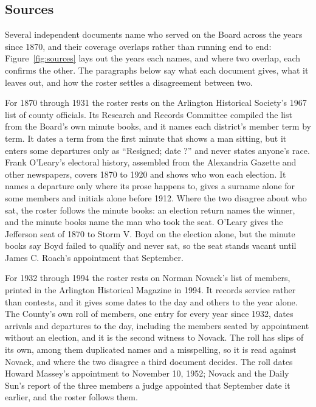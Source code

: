 \subsection{Sources}
Several independent documents name who served on the Board across the years
since 1870, and their coverage overlaps rather than running end to end:
Figure~\ref{fig:sources} lays out the years each names, and where two
overlap, each confirms the other. The paragraphs below say what each
document gives, what it leaves out, and how the roster settles a disagreement
between two.

For 1870 through 1931 the roster rests on the Arlington Historical Society's 1967 list of county
officials. Its Research and Records Committee compiled the list from the Board's
own minute books, and it names each district's member term by
term.\autocite{arlhist1967officials} It dates a term from the first minute that
shows a man sitting, but it enters some departures only as ``Resigned; date ?''
and never states anyone's race. Frank O'Leary's electoral history, assembled from
the Alexandria Gazette and other newspapers, covers 1870 to 1920 and shows who won
each election.\autocite{oleary2010} It names a departure only where its prose
happens to, gives a surname alone for some members and initials alone before 1912.
Where the two disagree about who sat, the roster follows the minute books: an election return
names the winner, and the minute books name the man who took the seat. O'Leary
gives the Jefferson seat of 1870 to Storm V. Boyd on the election alone, but the
minute books say Boyd failed to qualify and never sat, so the seat stands vacant
until James C. Roach's appointment that September.

For 1932 through 1994 the roster rests on Norman Novack's list of members, printed in the Arlington
Historical Magazine in 1994.\autocite{novack1994} It records service rather than
contests, and it gives some dates to the day and others to the year alone. The
County's own roll of members, one entry for every year since 1932, dates arrivals
and departures to the day, including the members seated by appointment without an
election, and it is the second witness to Novack.\autocite{arlingtonva2026members}
The roll has slips of its own, among them duplicated names and a misspelling, so
it is read against Novack, and where the two disagree a third document decides. The
roll dates Howard Massey's appointment to November 10, 1952; Novack and the Daily
Sun's report of the three members a judge appointed that September date it
earlier, and the roster follows them.\autocite{dailysun1952appointees}

